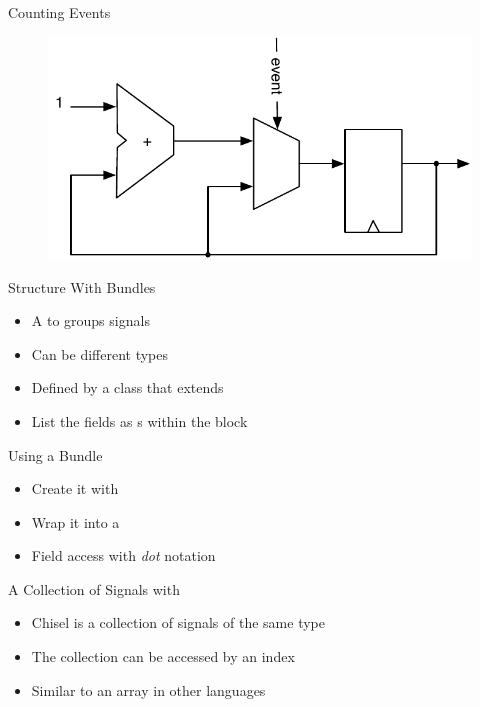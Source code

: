 \begin{frame}[fragile]{Counting Events}
\begin{figure}
  \includegraphics[scale=\scale]{../figures/event-counter}
\end{figure}
\end{frame}


\begin{frame}[fragile]{Structure With Bundles}
\begin{itemize}
\item A  to groups signals
\item Can be different types
\item Defined by a class that extends 
\item List the fields as s within the block
\end{itemize}
\end{frame}

\begin{frame}[fragile]{Using a Bundle}
\begin{itemize}
\item Create it with 
\item Wrap it into a 
\item Field access with \emph{dot} notation
\end{itemize}
\end{frame}

\begin{frame}[fragile]{A Collection of Signals with }
\begin{itemize}
\item Chisel  is a collection of signals of the same type
\item The collection can be accessed by an index
\item Similar to an array in other languages
\end{itemize}
\end{frame}

